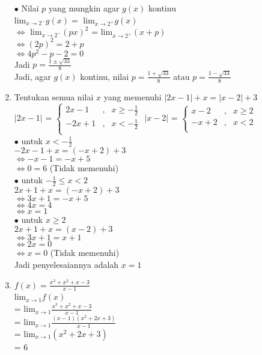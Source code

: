 \documentclass[12pt, a4paper]{article}
\begin{document}
\begin{enumerate}
    $\bullet$ Nilai $p$ yang mungkin agar $g(x)$ kontinu \\
    lim$_{x\rightarrow2^-} g(x) =$  lim$_{x\rightarrow2^+} g(x)$ \\
    $\Leftrightarrow$ lim$_{x\rightarrow2^-} (px)^2$ =  lim$_{x\rightarrow2^+} (x+p)$ \\
    $\Leftrightarrow (2p)^2 = 2 + p$  \\
    $\Leftrightarrow 4p^2 - p -2 = 0$  \\
    Jadi $p = \frac{1 \pm \sqrt{33}}{8}$ \\
    Jadi, agar $g(x)$ kontinu, nilai $p = \frac{1 + \sqrt{33}}{8}$ atau $p = \frac{1 - \sqrt{33}}{8}$
    \item Tentukan semua nilai $x$ yang memenuhi $|2x-1| + x = |x-2| + 3$ \\
        $|2x-1|$ =  $\left\{ \begin{array}{rcl}
        2x-1 & \mbox{,} & x \geq -\frac{1}{2} \\ 
        -2x+1 & \mbox{,} & x < -\frac{1}{2} \\
        \end{array}\right.$
        $|x-2|$ =  $\left\{ \begin{array}{rcl}
        x-2 & \mbox{,} & x \geq 2 \\ 
        -x+2 & \mbox{,} & x < 2 \\
        \end{array}\right.$ \\

    $\bullet$ untuk $x < -\frac{1}{2}$ \\
    $-2x-1+x = (-x+2) + 3$ \\
    $\Leftrightarrow -x-1 = -x+5$ \\
    $\Leftrightarrow 0 = 6$ (Tidak memenuhi)\\
    $\bullet$ untuk $-\frac{1}{2} \leq x < 2$ \\
    $2x+1+x = (-x+2) + 3$ \\
    $\Leftrightarrow 3x+1= -x + 5$ \\
    $\Leftrightarrow 4x= 4$ \\
    $\Leftrightarrow x= 1$ \\ 
    $\bullet$ untuk $x \geq 2$ \\ 
    $2x+1+x = (x-2)+3$ \\
    $\Leftrightarrow 3x+1= x+1$ \\ 
    $\Leftrightarrow 2x= 0$ \\
    $\Leftrightarrow x= 0$ (Tidak memenuhi)\\
    Jadi penyelesaiannya adalah $x = 1$ 

    \item $f(x) = \frac{x^3 + x^2 + x - 3}{x-1}$ \\
    lim$_{x\rightarrow1} f(x)$ \\
    = lim$_{x\rightarrow1} \frac{x^3 + x^2 + x - 3}{x-1}$ \\
    = lim$_{x\rightarrow1} \frac{(x-1)(x^2+2x+3)}{x-1}$ \\
    = lim$_{x\rightarrow1} (x^2+2x+3)$ \\
    = 6\\
\end{enumerate}
\end{document}
